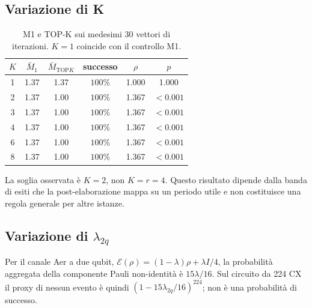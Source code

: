 \begin{onehalfspace}
\subsection{Variazione di K}
\label{subsec:sweep_k}

\begin{table}[H]
\centering
\caption[Sweep del numero di candidati]{M1 e TOP-K sui medesimi 30
vettori di iterazioni. $K=1$ coincide con il controllo M1.}
\label{tab:sweep_k}
\begin{tabular}{cccccc}
\toprule
$K$ & $\bar M_1$ & $\bar M_{\mathrm{TOP}K}$ & successo & $\rho$ & $p$ \\
\midrule
1 & 1.37 & 1.37 & $100\%$ & 1.000 & 1.000 \\
2 & 1.37 & 1.00 & $100\%$ & 1.367 & $<0.001$ \\
3 & 1.37 & 1.00 & $100\%$ & 1.367 & $<0.001$ \\
4 & 1.37 & 1.00 & $100\%$ & 1.367 & $<0.001$ \\
6 & 1.37 & 1.00 & $100\%$ & 1.367 & $<0.001$ \\
8 & 1.37 & 1.00 & $100\%$ & 1.367 & $<0.001$ \\
\bottomrule
\end{tabular}
\end{table}

La soglia osservata è $K=2$, non $K=r=4$. Questo risultato dipende
dalla banda di esiti che la post-elaborazione mappa su un periodo utile e
non costituisce una regola generale per altre istanze.

\subsection{Variazione di
\texorpdfstring{$\lambda_{2q}$}{lambda 2q}}
\label{subsec:sweep_eps}

Per il canale Aer a due qubit,
$\mathcal E(\rho)=(1-\lambda)\rho+\lambda I/4$, la probabilità
aggregata della componente Pauli non-identità è $15\lambda/16$. Sul
circuito da 224 CX il proxy di nessun evento è quindi
$(1-15\lambda_{2q}/16)^{224}$; non è una probabilità di successo.


\end{onehalfspace}
